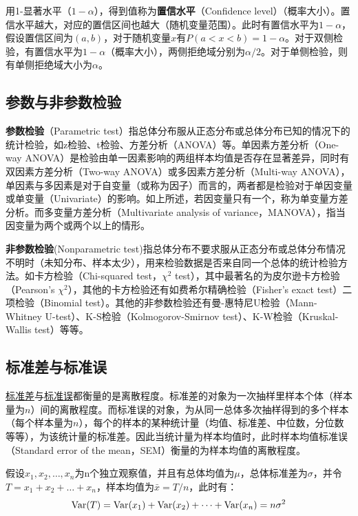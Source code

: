 \documentclass[11pt]{article}
\begin{document}
用1-显著水平（$1-\alpha$），得到值称为\textbf{置信水平}（Confidence level）（概率大小）。置信水平越大，对应的置信区间也越大（随机变量范围）。此时有置信水平为$1-\alpha$，假设置信区间为$(a,b)$，对于随机变量$x$有$P(a<x<b)=1-\alpha$。对于双侧检验，有置信水平为$1-\alpha$（概率大小），两侧拒绝域分别为$\alpha/2$。对于单侧检验，则有单侧拒绝域大小为$\alpha$。

\subsection{参数与非参数检验}

\textbf{参数检验}（Parametric test）指总体分布服从正态分布或总体分布已知的情况下的统计检验，如z检验、t检验、方差分析（ANOVA）等。单因素方差分析（One-way ANOVA）是检验由单一因素影响的两组样本均值是否存在显著差异，同时有双因素方差分析（Two-way ANOVA）或多因素方差分析（Multi-way ANOVA），单因素与多因素是对于自变量（或称为因子）而言的，两者都是检验对于单因变量或单变量（Univariate）的影响。如上所述，若因变量只有一个，称为单变量方差分析。而多变量方差分析（Multivariate analysis of variance，MANOVA），指当因变量为两个或两个以上的情形。

\textbf{非参数检验}(Nonparametric test)指总体分布不要求服从正态分布或总体分布情况不明时（未知分布、样本太少），用来检验数据是否来自同一个总体的统计检验方法。如卡方检验（Chi-squared test，$\chi^2$ test），其中最著名的为皮尔逊卡方检验（Pearson's $\chi^2$），其他的卡方检验还有如费希尔精确检验（Fisher's exact test）二项检验（Binomial test）。其他的非参数检验还有曼-惠特尼U检验（Mann-Whitney U-test）、K-S检验（Kolmogorov-Smirnov test）、K-W检验（Kruskal-Wallis test）等等。

\subsection{标准差与标准误}
    
\uline{标准差}与\uline{标准误}都衡量的是离散程度。标准差的对象为一次抽样里样本个体（样本量为$n$）间的离散程度。而标准误的对象，为从同一总体多次抽样得到的多个样本（每个样本量为$n$），每个的样本的某种统计量（均值、标准差、中位数，分位数等等），为该统计量的标准差。因此当统计量为样本均值时，此时样本均值标准误（Standard error of the mean，SEM）衡量的为样本均值的离散程度。
    
假设$x_1,x_2,\dots,x_n$为n个独立观察值，并且有总体均值为$\mu$，总体标准差为$\sigma$，并令$T = x_1 + x_2 + \dots + x_n$，样本均值为$\bar{x} = T/n$，此时有：
\begin{equation*}
    \operatorname{Var}(T) = \operatorname{Var}(x_1) + \operatorname{Var}(x_2) + \dots + \operatorname{Var}(x_n) = n \sigma^2
\end{equation*}
    
\end{document}
